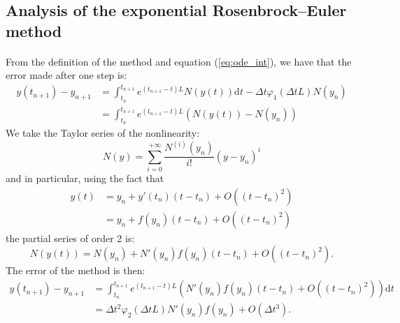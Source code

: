    \subsection{Analysis of the exponential Rosenbrock--Euler method}

      \paragraph{}
      From the definition of the method and equation (\ref{eq:ode_int}), we have that the error made after one step is:
      \begin{equation}
        \begin{aligned}
          y\left(t_{n+1}\right) - y_{n+1} &= \int_{t_n}^{t_{n+1}} e^{\left(t_{n+1} - t\right) L} N\left(y\left(t\right)\right) \mathrm{d}t  - \Delta t \varphi_1\left(\Delta t L\right) N\left(y_n\right) \\
          &= \int_{t_n}^{t_{n+1}} e^{\left(t_{n+1} - t\right) L} \left( N\left(y\left(t\right)\right) - N\left(y_n\right) \right)
        \end{aligned}
      \end{equation}
      We take the Taylor series of the nonlinearity:
      \begin{equation}
        N\left(y\right) = \sum_{i = 0}^{+\infty} \frac{N^{\left(i\right)}\left(y_n\right)}{i!}\left(y - y_n\right)^i
      \end{equation}
      and in particular, using the fact that
      \begin{equation}
        \begin{aligned}
          y\left(t\right) &= y_n + y'\left(t_n\right)\left(t - t_n\right) + O\left(\left(t - t_n\right)^2\right) \\
          & = y_n + f\left(y_n\right)\left(t - t_n\right) + O\left(\left(t - t_n\right)^2\right)
        \end{aligned}
      \end{equation}
      the partial series of order 2 is:
      \begin{equation}
        N\left(y\left(t\right)\right) = N\left(y_n\right) + N'\left(y_n\right)f\left(y_n\right)\left(t - t_n\right) + O\left(\left(t - t_n\right)^2\right) .
      \end{equation}
      The error of the method is then:
      \begin{equation}
        \begin{aligned}
          y\left(t_{n+1}\right) - y_{n+1} &= \int_{t_n}^{t_{n+1}} e^{\left(t_{n+1} - t\right) L} \left( N'\left(y_n\right)f\left(y_n\right)\left(t - t_n\right) + O\left(\left(t - t_n\right)^2\right) \right) \mathrm{d}t \\
          &= \Delta t^2\varphi_2\left(\Delta t L\right) N'\left(y_n\right)f\left(y_n\right) + O\left(\Delta t^3\right) .
        \end{aligned}
      \end{equation}
